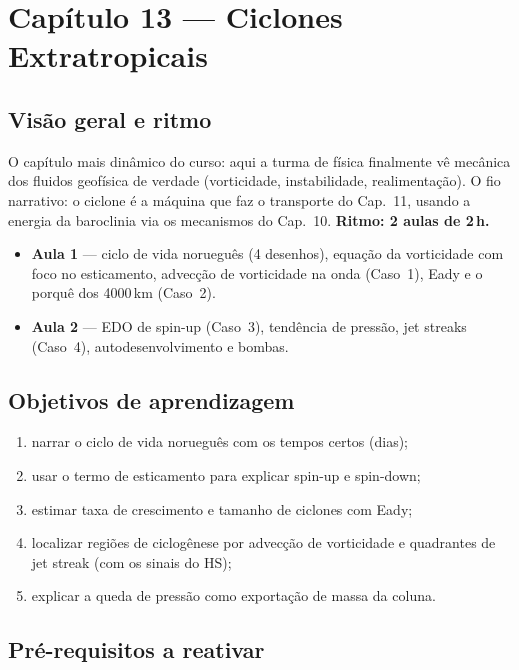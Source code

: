 \section{Capítulo 13 --- Ciclones Extratropicais}

\subsection*{Visão geral e ritmo}

O capítulo mais dinâmico do curso: aqui a turma de física finalmente vê
mecânica dos fluidos geofísica de verdade (vorticidade, instabilidade,
realimentação). O fio narrativo: o ciclone é a máquina que faz o
transporte do Cap.~11, usando a energia da baroclinia via os mecanismos
do Cap.~10. \textbf{Ritmo: 2 aulas de 2\,h.}

\begin{itemize}
  \item \textbf{Aula 1} — ciclo de vida norueguês (4 desenhos), equação
        da vorticidade com foco no esticamento, advecção de vorticidade
        na onda (Caso~1), Eady e o porquê dos 4000\,km (Caso~2).
  \item \textbf{Aula 2} — EDO de spin-up (Caso~3), tendência de
        pressão, jet streaks (Caso~4), autodesenvolvimento e bombas.
\end{itemize}

\subsection*{Objetivos de aprendizagem}

\begin{enumerate}
  \item narrar o ciclo de vida norueguês com os tempos certos (dias);
  \item usar o termo de esticamento para explicar spin-up e spin-down;
  \item estimar taxa de crescimento e tamanho de ciclones com Eady;
  \item localizar regiões de ciclogênese por advecção de vorticidade e
        quadrantes de jet streak (com os sinais do HS);
  \item explicar a queda de pressão como exportação de massa da coluna.
\end{enumerate}

\subsection*{Pré-requisitos a reativar}

